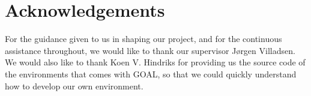 \chapter{Acknowledgements}

For the guidance given to us in shaping our project, and for the continuous assistance throughout, we would like to thank our supervisor J{\o}rgen Villadsen. 
\\
We would also like to thank Koen V. Hindriks for providing us the 
source code of the environments that comes with GOAL, so that we could quickly understand how to develop our own environment.

